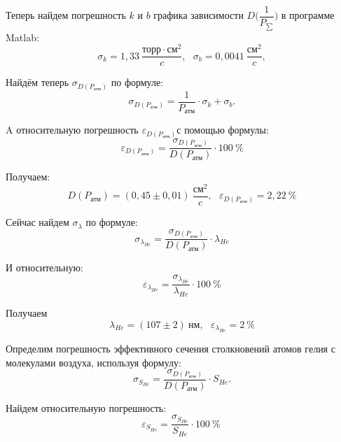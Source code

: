 \documentclass[a4paper,12pt]{article}
\begin{document}
Теперь найдем погрешность $k$ и $b$ графика зависимости $D\bigg(\dfrac{1}{P_{\sum}}\bigg)$ в программе Matlab:
\begin{equation}
	\sigma_k = 1,33 \ \frac{\text{торр}\cdot \text{см}^2}{c}, \ ~ \ \sigma_b = 0,0041 \ \frac{\text{см}^2}{c},
\end{equation}

Найдём теперь $\sigma_{D(P_{\text{атм}})}$ по формуле:
\begin{equation}
	\sigma_{D(P_{\text{атм}})} = \dfrac{1}{P_{\text{атм}}} \cdot \sigma_k + \sigma_b.
\end{equation}

A относительную погрешность $\varepsilon_{D(P_{\text{атм}})}$с помощью формулы:
\begin{equation}
	\varepsilon_{D(P_{\text{атм}})} = \dfrac{\sigma_{D(P_{\text{атм}})}}{D(P_{\text{атм}})}\cdot 100\ \%
\end{equation}

Получаем:
\begin{equation}
	D(P_{\text{атм}}) = (0,45 \pm 0,01)\ \frac{\text{см}^2}{c}, \ ~ \ \varepsilon_{D(P_{\text{атм}})} = 2,22\ \%
\end{equation}

Сейчас найдем $\sigma_{\lambda}$ по формуле:
\begin{equation}
	\sigma_{\lambda_{He}} = \dfrac{\sigma_{D(P_{\text{атм}})}}{D(P_{\text{атм}})} \cdot \lambda_{He}
\end{equation}

И относительную:
\begin{equation}
	\varepsilon_{\lambda_{He}} = \dfrac{\sigma_{\lambda_{He}}}{\lambda_{He}}\cdot 100\ \%
\end{equation}

Получаем
\begin{equation}
	\lambda_{He} = (107 \pm 2)\ \text{нм}, \ ~ \ \varepsilon_{\lambda_{He}} = 2\ \%
\end{equation}


Определим погрешность эффективного сечения столкновений атомов гелия с молекулами воздуха, используя формулу:  
\begin{equation}
	\sigma_{S_{He}} = \dfrac{\sigma_{D(P_{\text{атм}})}}{D(P_{\text{атм}})} \cdot S_{He}.
\end{equation}

Найдем относительную погрешность:
\begin{equation}
	\varepsilon_{S_{He}} = \dfrac{\sigma_{S_{He}}}{S_{He}}\cdot 100\ \%\ 
\end{equation}
\end{document}
